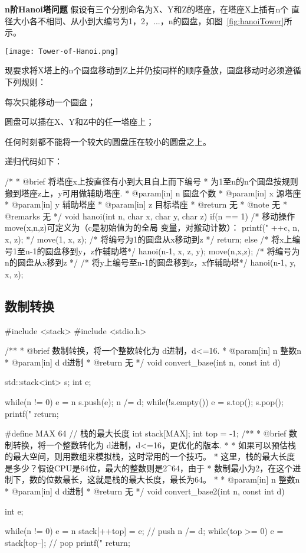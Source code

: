 \textbf{n阶Hanoi塔问题} 假设有三个分别命名为X、Y和Z的塔座，在塔座X上插有n个
直径大小各不相同、从小到大编号为1，2，...，n的圆盘，如图~\ref{fig:hanoiTower}所示。

\begin{center}
\texttt{[image: Tower-of-Hanoi.png]}\\
\label{fig:hanoiTower}
\end{center}


现要求将X塔上的n个圆盘移动到Z上并仍按同样的顺序叠放，圆盘移动时必须遵循下列规则：
\begindot
\item 每次只能移动一个圆盘；
\item 圆盘可以插在X、Y和Z中的任一塔座上；
\item 任何时刻都不能将一个较大的圆盘压在较小的圆盘之上。
\myenddot

递归代码如下：
\begin{Codex}[label=hanoi.c]
/*
 * @brief 将塔座x上按直径有小到大且自上而下编号
 * 为1至n的n个圆盘按规则搬到塔座z上，y可用做辅助塔座.
 * @param[in] n 圆盘个数
 * @param[in] x 源塔座
 * @param[in] y 辅助塔座
 * @param[in] z 目标塔座
 * @return 无
 * @note 无
 * @remarks 无
 */
void hanoi(int n, char x, char y, char z)
{
    if(n ==  1) {
        /* 移动操作move(x,n,z)可定义为（c是初始值为的全局
           变量，对搬动计数）：
           printf("%
                                        ++c, n, x, z);
        */
        move(1, x, z); /* 将编号为1的圆盘从x移动到z */
        return;
    } else {
        /* 将x上编号1至n-1的圆盘移到y，z作辅助塔*/
        hanoi(n-1, x, z, y); 
        move(n,x,z);  /* 将编号为n的圆盘从x移到z */
        /* 将y上编号至n-1的圆盘移到z，x作辅助塔*/
        hanoi(n-1, y, x, z); 
    }
}
\end{Codex}

\subsection{数制转换}
\begin{Codex}[label=convert_base.cpp]
#include <stack>
#include <stdio.h>

 /**
  * @brief 数制转换，将一个整数转化为 d进制，d<=16.
  * @param[in] n 整数n
  * @param[in] d d进制
  * @return 无
  */
void convert_base(int n, const int d) {
	std::stack<int> s;
	int e;

	while(n != 0) {
		e = n %
		s.push(e);
		n /= d;
	}
	while(!s.empty()) {
		e = s.top();
		s.pop();
		printf("%
	}
	return;
}

#define MAX 64 // 栈的最大长度
int stack[MAX];
int top = -1;
 /**
  * @brief 数制转换，将一个整数转化为 d进制，d<=16，更优化的版本.
  *
  * 如果可以预估栈的最大空间，则用数组来模拟栈，这时常用的一个技巧。
  * 这里，栈的最大长度是多少？假设CPU是64位，最大的整数则是2^64，由于
  * 数制最小为2，在这个进制下，数的位数最长，这就是栈的最大长度，最长为64。
  *
  * @param[in] n 整数n
  * @param[in] d d进制
  * @return 无
  */
void convert_base2(int n, const int d) {
	int e;

	while(n != 0) {
		e = n %
		stack[++top] = e; // push
		n /= d;
	}
	while(top >= 0) {
		e = stack[top--]; // pop
		printf("%
	}
	return;
}
\end{Codex}

